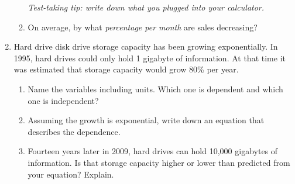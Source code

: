 \documentclass[12pt]{article}
\begin{document}
\begin{enumerate}
\begin{enumerate}
\emph{Test-taking tip:  write down what you plugged into your calculator.}
\vfill
\vfill
\item On average, by what \textit{percentage per month} are sales decreasing?
\vfill
\end{enumerate}

\hrulefill

\item Hard drive disk drive storage capacity has been growing exponentially.  In 1995, hard drives could only hold 1 gigabyte of information.  At that time it was estimated that storage capacity would grow 80\% per year.
\begin{enumerate}
\item Name the variables including units.  Which one is dependent and which one is independent?
\vfill
\item Assuming the growth is exponential, write down an equation that describes the dependence.
\vfill
\item Fourteen years later in 2009, hard drives can hold 10,000 gigabytes of information.  Is that storage capacity higher or lower than predicted from your equation?  Explain.
\vfill
\end{enumerate}

\end{enumerate}
\end{document}
